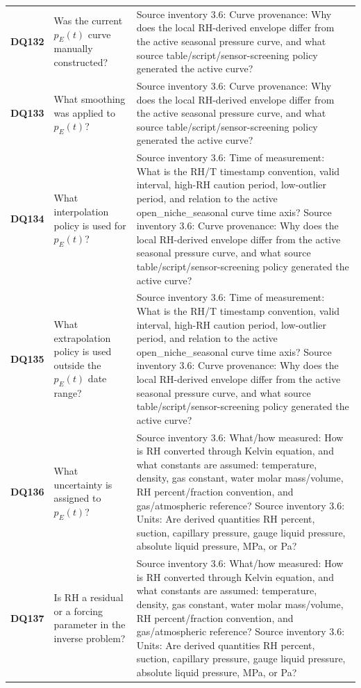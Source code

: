\begin{longtable}{@{}L{0.09\textwidth} L{0.31\textwidth} L{0.52\textwidth}@{}}
\addlinespace[0.18em]
\textbf{DQ132} & Was the current \(p_E(t)\) curve manually constructed? & Source inventory 3.6: Curve provenance: Why does the local RH-derived envelope differ from the active seasonal pressure curve, and what source table/script/sensor-screening policy generated the active curve?\\
\addlinespace[0.18em]
\textbf{DQ133} & What smoothing was applied to \(p_E(t)\)? & Source inventory 3.6: Curve provenance: Why does the local RH-derived envelope differ from the active seasonal pressure curve, and what source table/script/sensor-screening policy generated the active curve?\\
\addlinespace[0.18em]
\textbf{DQ134} & What interpolation policy is used for \(p_E(t)\)? & Source inventory 3.6: Time of measurement: What is the RH/T timestamp convention, valid interval, high-RH caution period, low-outlier period, and relation to the active open\_niche\_seasonal curve time axis? Source inventory 3.6: Curve provenance: Why does the local RH-derived envelope differ from the active seasonal pressure curve, and what source table/script/sensor-screening policy generated the active curve?\\
\addlinespace[0.18em]
\textbf{DQ135} & What extrapolation policy is used outside the \(p_E(t)\) date range? & Source inventory 3.6: Time of measurement: What is the RH/T timestamp convention, valid interval, high-RH caution period, low-outlier period, and relation to the active open\_niche\_seasonal curve time axis? Source inventory 3.6: Curve provenance: Why does the local RH-derived envelope differ from the active seasonal pressure curve, and what source table/script/sensor-screening policy generated the active curve?\\
\addlinespace[0.18em]
\textbf{DQ136} & What uncertainty is assigned to \(p_E(t)\)? & Source inventory 3.6: What/how measured: How is RH converted through Kelvin equation, and what constants are assumed: temperature, density, gas constant, water molar mass/volume, RH percent/fraction convention, and gas/atmospheric reference? Source inventory 3.6: Units: Are derived quantities RH percent, suction, capillary pressure, gauge liquid pressure, absolute liquid pressure, MPa, or Pa?\\
\addlinespace[0.18em]
\textbf{DQ137} & Is RH a residual or a forcing parameter in the inverse problem? & Source inventory 3.6: What/how measured: How is RH converted through Kelvin equation, and what constants are assumed: temperature, density, gas constant, water molar mass/volume, RH percent/fraction convention, and gas/atmospheric reference? Source inventory 3.6: Units: Are derived quantities RH percent, suction, capillary pressure, gauge liquid pressure, absolute liquid pressure, MPa, or Pa?\\

\end{longtable}
